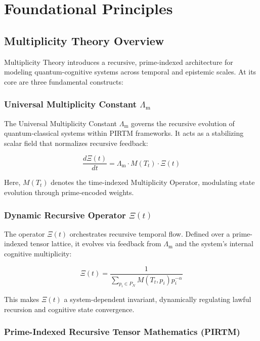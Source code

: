 \documentclass[12pt]{article}
\newcommand{\LambdaM}{\Lambda_{\mathrm{m}}}
\begin{document}
\section{Foundational Principles}

\subsection{Multiplicity Theory Overview}

Multiplicity Theory introduces a recursive, prime-indexed architecture for modeling quantum-cognitive systems across temporal and epistemic scales. At its core are three fundamental constructs:

\subsubsection*{Universal Multiplicity Constant $\LambdaM$}

The Universal Multiplicity Constant $\LambdaM$ governs the recursive evolution of quantum-classical systems within PIRTM frameworks. It acts as a stabilizing scalar field that normalizes recursive feedback:

\begin{equation}
\frac{d\Xi(t)}{dt} = \LambdaM \cdot M(T_t) \cdot \Xi(t)
\end{equation}

Here, $M(T_t)$ denotes the time-indexed Multiplicity Operator, modulating state evolution through prime-encoded weights.

\subsubsection*{Dynamic Recursive Operator $\Xi(t)$}

The operator $\Xi(t)$ orchestrates recursive temporal flow. Defined over a prime-indexed tensor lattice, it evolves via feedback from $\LambdaM$ and the system's internal cognitive multiplicity:

\begin{equation}
\Xi(t) = \frac{1}{\sum_{p_i \in P_N} M(T_t, p_i) p_i^{-\alpha}}
\end{equation}

This makes $\Xi(t)$ a system-dependent invariant, dynamically regulating lawful recursion and cognitive state convergence.

\subsubsection*{Prime-Indexed Recursive Tensor Mathematics (PIRTM)}
\end{document}
